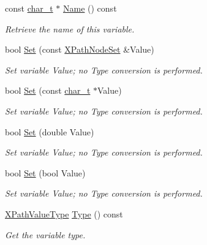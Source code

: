 \begin{DoxyCompactItemize}
const \hyperlink{namespaceMezzanine_1_1xml_a29b8a47c179e9895c4e9e66c45d1dbbc}{char\_\-t} $\ast$ \hyperlink{classMezzanine_1_1xml_1_1XPathVariable_a5540a0263ea07f7233bd0822389b06cb}{Name} () const 
\begin{DoxyCompactList}\small\item\em Retrieve the name of this variable. \item\end{DoxyCompactList}\item 
bool \hyperlink{classMezzanine_1_1xml_1_1XPathVariable_ad5f8b239cb22e326df14a072375038ba}{Set} (const \hyperlink{classMezzanine_1_1xml_1_1XPathNodeSet}{XPathNodeSet} \&Value)
\begin{DoxyCompactList}\small\item\em Set variable Value; no Type conversion is performed. \item\end{DoxyCompactList}\item 
bool \hyperlink{classMezzanine_1_1xml_1_1XPathVariable_aeefef0754650e87ac6199d75884c4a7b}{Set} (const \hyperlink{namespaceMezzanine_1_1xml_a29b8a47c179e9895c4e9e66c45d1dbbc}{char\_\-t} $\ast$Value)
\begin{DoxyCompactList}\small\item\em Set variable Value; no Type conversion is performed. \item\end{DoxyCompactList}\item 
bool \hyperlink{classMezzanine_1_1xml_1_1XPathVariable_abd586361bbc82966f87c7fbc1faa3bb9}{Set} (double Value)
\begin{DoxyCompactList}\small\item\em Set variable Value; no Type conversion is performed. \item\end{DoxyCompactList}\item 
bool \hyperlink{classMezzanine_1_1xml_1_1XPathVariable_a9e7eec64d1bda649983b2a8276fc7811}{Set} (bool Value)
\begin{DoxyCompactList}\small\item\em Set variable Value; no Type conversion is performed. \item\end{DoxyCompactList}\item 
\hyperlink{namespaceMezzanine_1_1xml_aca3f7ad3597c316e5ee6c216e126e7b0}{XPathValueType} \hyperlink{classMezzanine_1_1xml_1_1XPathVariable_a4ffa685f421aa905015249a78a184ad3}{Type} () const 
\begin{DoxyCompactList}\small\item\em Get the variable type. \item\end{DoxyCompactList}\end{DoxyCompactItemize}
